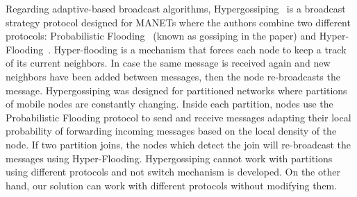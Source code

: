 Regarding adaptive-based broadcast algorithms, Hypergossiping~\cite{hypergossiping} is a broadcast strategy protocol designed for MANETs where the authors combine two different protocols: Probabilistic Flooding~\cite{Ni1999} (known as gossiping in the paper) and Hyper-Flooding~\cite{Cheng2005}. 
Hyper-flooding is a mechanism that forces each node to keep a track of its current neighbors. In case the same message is received again and new neighbors have been added between messages, then the node re-broadcasts the message.
Hypergossiping was designed for partitioned networks where partitions of mobile nodes are constantly changing.
Inside each partition, nodes use the Probabilistic Flooding protocol to send and receive messages adapting their local probability of forwarding incoming messages based on the local density of the node.
If two partition joins, the nodes which detect the join will re-broadcast the messages using Hyper-Flooding.
Hypergossiping cannot work with partitions using different protocols and not switch mechanism is developed.
On the other hand, our solution can work with different protocols without modifying them.

